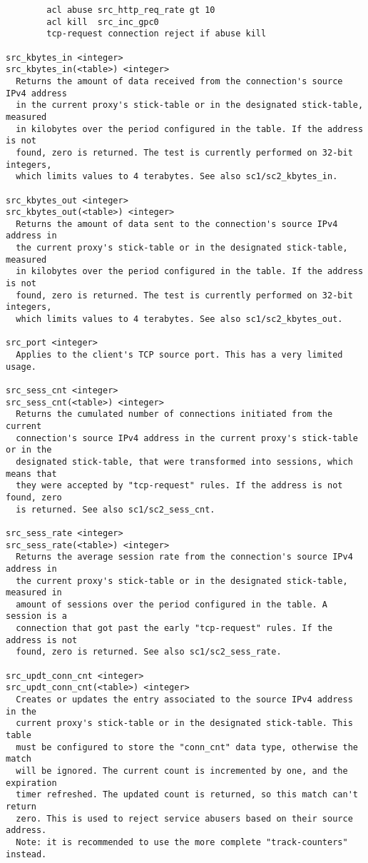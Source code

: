 \begin{verbatim}
        acl abuse src_http_req_rate gt 10
        acl kill  src_inc_gpc0
        tcp-request connection reject if abuse kill

src_kbytes_in <integer>
src_kbytes_in(<table>) <integer>
  Returns the amount of data received from the connection's source IPv4 address
  in the current proxy's stick-table or in the designated stick-table, measured
  in kilobytes over the period configured in the table. If the address is not
  found, zero is returned. The test is currently performed on 32-bit integers,
  which limits values to 4 terabytes. See also sc1/sc2_kbytes_in.

src_kbytes_out <integer>
src_kbytes_out(<table>) <integer>
  Returns the amount of data sent to the connection's source IPv4 address in
  the current proxy's stick-table or in the designated stick-table, measured
  in kilobytes over the period configured in the table. If the address is not
  found, zero is returned. The test is currently performed on 32-bit integers,
  which limits values to 4 terabytes. See also sc1/sc2_kbytes_out.

src_port <integer>
  Applies to the client's TCP source port. This has a very limited usage.

src_sess_cnt <integer>
src_sess_cnt(<table>) <integer>
  Returns the cumulated number of connections initiated from the current
  connection's source IPv4 address in the current proxy's stick-table or in the
  designated stick-table, that were transformed into sessions, which means that
  they were accepted by "tcp-request" rules. If the address is not found, zero
  is returned. See also sc1/sc2_sess_cnt.

src_sess_rate <integer>
src_sess_rate(<table>) <integer>
  Returns the average session rate from the connection's source IPv4 address in
  the current proxy's stick-table or in the designated stick-table, measured in
  amount of sessions over the period configured in the table. A session is a
  connection that got past the early "tcp-request" rules. If the address is not
  found, zero is returned. See also sc1/sc2_sess_rate.

src_updt_conn_cnt <integer>
src_updt_conn_cnt(<table>) <integer>
  Creates or updates the entry associated to the source IPv4 address in the
  current proxy's stick-table or in the designated stick-table. This table
  must be configured to store the "conn_cnt" data type, otherwise the match
  will be ignored. The current count is incremented by one, and the expiration
  timer refreshed. The updated count is returned, so this match can't return
  zero. This is used to reject service abusers based on their source address.
  Note: it is recommended to use the more complete "track-counters" instead.


\end{verbatim}

